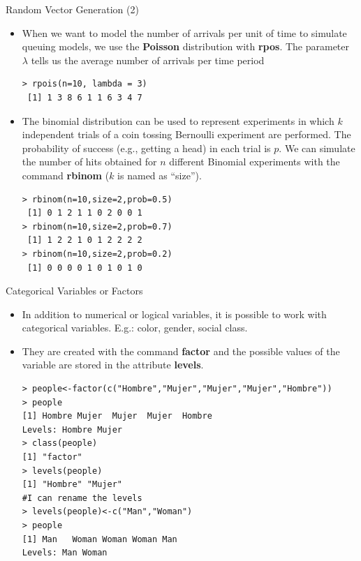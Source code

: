 \documentclass[handout]{beamer}
\begin{document}
\begin{frame}[fragile]{Random Vector Generation (2)}
\scriptsize{
\begin{itemize}
 \item When we want to model the number of arrivals per unit of time to simulate queuing models, we use the \textbf{Poisson} distribution with \textbf{rpos}. The parameter $\lambda$ tells us the average number of arrivals per time period
 \begin{verbatim}
> rpois(n=10, lambda = 3)
 [1] 1 3 8 6 1 1 6 3 4 7
 \end{verbatim}

 \item The binomial distribution can be used to represent experiments in which $k$ independent trials of a coin tossing Bernoulli experiment are performed. The probability of success (e.g., getting a head) in each trial is $p$.  We can simulate the number of hits obtained for $n$ different Binomial experiments with the command \textbf{rbinom} ($k$ is named as ``size'').
\begin{verbatim}
> rbinom(n=10,size=2,prob=0.5)
 [1] 0 1 2 1 1 0 2 0 0 1
> rbinom(n=10,size=2,prob=0.7)
 [1] 1 2 2 1 0 1 2 2 2 2
> rbinom(n=10,size=2,prob=0.2)
 [1] 0 0 0 0 1 0 1 0 1 0 
\end{verbatim}

 
 
\end{itemize}


}
\end{frame}


\begin{frame}[fragile]{Categorical Variables or Factors}
\scriptsize{
\begin{itemize}
 \item In addition to numerical or logical variables, it is possible to work with categorical variables. E.g.: color, gender, social class.
 \item They are created with the command \textbf{factor} and the possible values of the variable are stored in the attribute \textbf{levels}.
\begin{verbatim}
> people<-factor(c("Hombre","Mujer","Mujer","Mujer","Hombre"))
> people
[1] Hombre Mujer  Mujer  Mujer  Hombre
Levels: Hombre Mujer
> class(people)
[1] "factor"
> levels(people)
[1] "Hombre" "Mujer" 
#I can rename the levels
> levels(people)<-c("Man","Woman")
> people
[1] Man   Woman Woman Woman Man  
Levels: Man Woman
\end{verbatim}
 
\end{itemize}

}
\end{frame}
\end{document}
